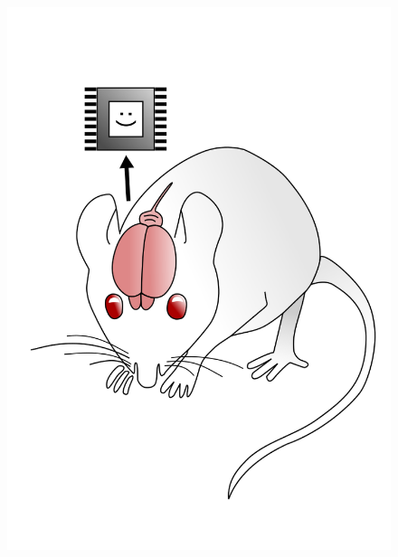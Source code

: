 \documentclass[12pt, aspectratio=169]{beamer}
\begin{document}
\begin{frame}
\begin{columns}[c]
\begin{figure}
\includegraphics[width=1.0\linewidth]{mousebrainpink}
\end{figure}
\end{columns}
\end{frame}

\end{document}

